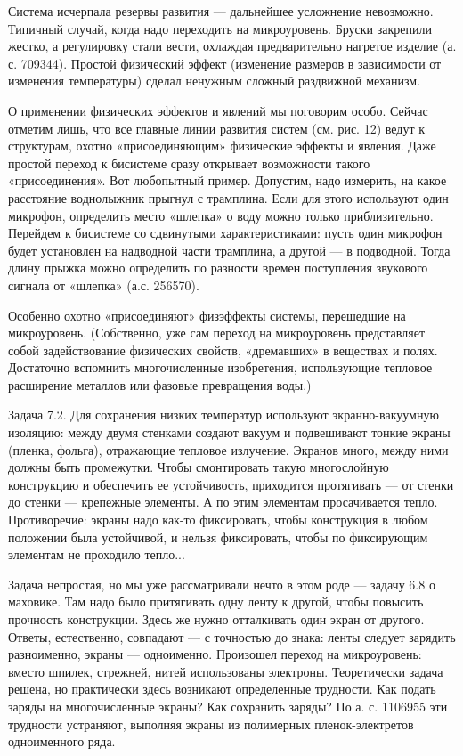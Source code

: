 Система исчерпала резервы развития — дальнейшее усложнение невозможно.
Типичный  случай,  когда  надо   переходить  на  микроуровень.  Бруски
закрепили жестко,  а регулировку стали вести,  охлаждая предварительно
нагретое изделие (а. с.  709344). Простой физический эффект (изменение
размеров  в  зависимости  от изменения  температуры)  сделал  ненужным
сложный раздвижной механизм.

О  применении  физических  эффектов  и  явлений  мы  поговорим  особо.
Сейчас  отметим  лишь, что  все  главные  линии развития  систем  (см.
рис.  12)  ведут  к  структурам,  охотно  «присоединяющим»  физические
эффекты и  явления. Даже простой  переход к бисистеме  сразу открывает
возможности такого  «присоединения». Вот любопытный  пример. Допустим,
надо измерить,  на какое  расстояние воднолыжник прыгнул  с трамплина.
Если для этого  используют один микрофон, определить  место «шлепка» о
воду можно  только приблизительно. Перейдем к  бисистеме со сдвинутыми
характеристиками: пусть  один микрофон  будет установлен  на надводной
части  трамплина, а  другой —  в подводной.  Тогда длину  прыжка можно
определить  по  разности  времен   поступления  звукового  сигнала  от
«шлепка» (а.с. 256570).

Особенно  охотно  «присоединяют»  физэффекты  системы,  перешедшие  на
микроуровень.   (Собственно,   уже   сам   переход   на   микроуровень
представляет  собой задействование  физических свойств,  «дремавших» в
веществах  и полях.  Достаточно вспомнить  многочисленные изобретения,
использующие  тепловое  расширение  металлов или  фазовые  превращения
воды.)

Задача    7.2.   Для    сохранения   низких    температур   используют
экранно-вакуумную  изоляцию: между  двумя  стенками  создают вакуум  и
подвешивают  тонкие  экраны   (пленка,  фольга),  отражающие  тепловое
излучение.  Экранов   много,  между   ними  должны   быть  промежутки.
Чтобы  смонтировать такую  многослойную  конструкцию  и обеспечить  ее
устойчивость, приходится протягивать — от стенки до стенки — крепежные
элементы.  А  по  этим элементам  просачивается  тепло.  Противоречие:
экраны надо  как-то фиксировать,  чтобы конструкция в  любом положении
была устойчивой, и нельзя  фиксировать, чтобы по фиксирующим элементам
не проходило тепло...

Задача непростая, но  мы уже рассматривали нечто в этом  роде — задачу
6.8 о маховике.  Там надо было притягивать одну ленту  к другой, чтобы
повысить прочность конструкции. Здесь  же нужно отталкивать один экран
от другого.  Ответы, естественно,  совпадают —  с точностью  до знака:
ленты  следует зарядить  разноименно, экраны  — одноименно.  Произошел
переход на  микроуровень: вместо шпилек, стрежней,  нитей использованы
электроны. Теоретически задача решена,  но практически здесь возникают
определенные трудности.  Как подать  заряды на  многочисленные экраны?
Как  сохранить  заряды? По  а.  с.  1106955 эти  трудности  устраняют,
выполняя экраны из полимерных пленок-электретов одноименного ряда.


